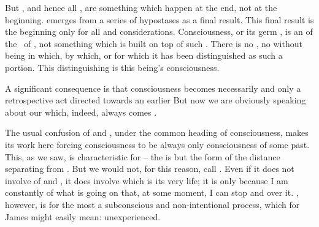 But , and hence all , are
something which happen at the end, not at the beginning. 
emerges from a series of hypostases as a final result. This final result is
the beginning only for all  and  considerations. 
Consciousness, or its germ , is an  of 
the \nexus\ of  , not 
something which is built on top of such .
There is no , no 
without being in which, by which, or for which it has been distinguished
as such a portion. This distinguishing is this being's consciousness. 

\pa A significant consequence is that consciousness becomes necessarily and only
a retrospective act directed towards an earlier 
 But now we
are obviously speaking about our  which, indeed, always comes
.

The usual confusion of  and , under the common
heading of consciousness, makes its work here forcing consciousness to be always
only consciousness of some past.  This, as we saw, is characteristic for
 -- the  is but the form of the distance separating
 from .  But we would not, for this reason, call
 .  Even if it does not involve  of  and , it does involve 
which is its very life; it is only because I am constantly  of what is
going on that, at some moment, I can stop and  over it.
, however, is for the most a subconscious and non-intentional
process, which for James might easily mean: unexperienced.

